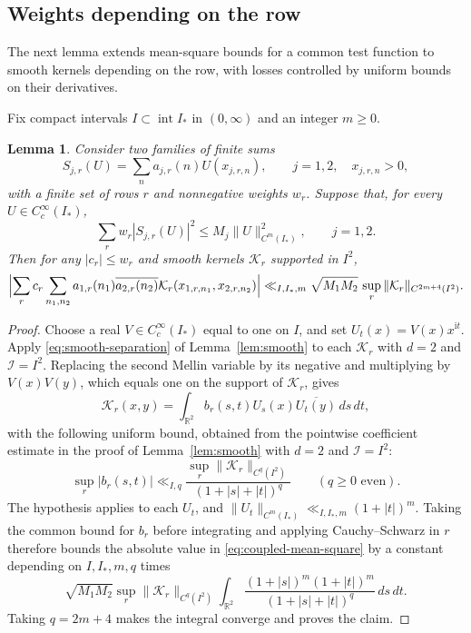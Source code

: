 \documentclass[11pt,a4paper]{article}
\numberwithin{equation}{section}
\numberwithin{figure}{section}
\newtheorem{lemma}[theorem]{Lemma}
\theoremstyle{definition}
\theoremstyle{remark}
\begin{document}
\subsection{Weights depending on the row}
The next lemma extends mean-square bounds for a common test
function to smooth kernels depending on the row, with losses controlled
by uniform bounds on their derivatives.

Fix compact intervals $I\subset\operatorname{int}I_*$ in $(0,\infty)$
and an integer $m\ge0$.

\begin{lemma}\label{lem:smooth-mean-square}
Consider two families of finite sums
\[
 S_{j,r}(U)=\sum_n a_{j,r}(n)U(x_{j,r,n}),\qquad
 j=1,2,\quad x_{j,r,n}>0,
\]
with a finite set of rows $r$ and nonnegative weights $w_r$.
Suppose that, for every $U\in C_c^\infty(I_*)$,
\[
 \sum_r w_r|S_{j,r}(U)|^2\le M_j\|U\|_{C^m(I_*)}^2,
 \qquad j=1,2.
\]
Then for any $|c_r|\le w_r$ and smooth kernels $\mathcal K_r$
supported in $I^2$,
\begin{equation}\label{eq:coupled-mean-square}
 \Bigl|\sum_r c_r\sum_{n_1,n_2}
 a_{1,r}(n_1)\overline{a_{2,r}(n_2)}
 \mathcal K_r(x_{1,r,n_1},x_{2,r,n_2})\Bigr|
 \ll_{I,I_*,m}\sqrt{M_1M_2}\,
       \sup_r\|\mathcal K_r\|_{C^{2m+4}(I^2)}.
\end{equation}
\end{lemma}
\begin{proof}
Choose a real $V\in C_c^\infty(I_*)$ equal to one on $I$, and set
$U_t(x)=V(x)x^{\mathrm i t}$.
Apply \eqref{eq:smooth-separation} of Lemma~\ref{lem:smooth}
to each $\mathcal K_r$ with $d=2$ and $\mathcal I=I^2$.
Replacing the second Mellin variable by its negative and multiplying
by $V(x)V(y)$, which equals one on the support of $\mathcal K_r$, gives
\[
 \mathcal K_r(x,y)=\int_{\mathbb R^2}b_r(s,t)
 U_s(x)\overline{U_t(y)}\,ds\,dt,
\]
with the following uniform bound, obtained from the pointwise
coefficient estimate in the proof of Lemma~\ref{lem:smooth} with
$d=2$ and $\mathcal I=I^2$:
\[
 \sup_r|b_r(s,t)|\ll_{I,q}
 \frac{\sup_r\|\mathcal K_r\|_{C^q(I^2)}}{(1+|s|+|t|)^q}
 \qquad(q\ge0\text{ even}).
\]
The hypothesis applies to each $U_t$, and
$\|U_t\|_{C^m(I_*)}\ll_{I,I_*,m}(1+|t|)^m$. Taking the common bound for $b_r$ before integrating and applying Cauchy--Schwarz in $r$ therefore bounds the absolute value in \eqref{eq:coupled-mean-square} by a constant depending on $I,I_*,m,q$ times
\begin{equation}\label{eq:kernel-bilinear-integral}
 \sqrt{M_1M_2}\sup_r\|\mathcal K_r\|_{C^q(I^2)}
 \int_{\mathbb R^2}
 \frac{(1+|s|)^m(1+|t|)^m}{(1+|s|+|t|)^q}\,ds\,dt.
\end{equation}
Taking $q=2m+4$ makes the integral converge and proves the claim.
\end{proof}
\end{document}
